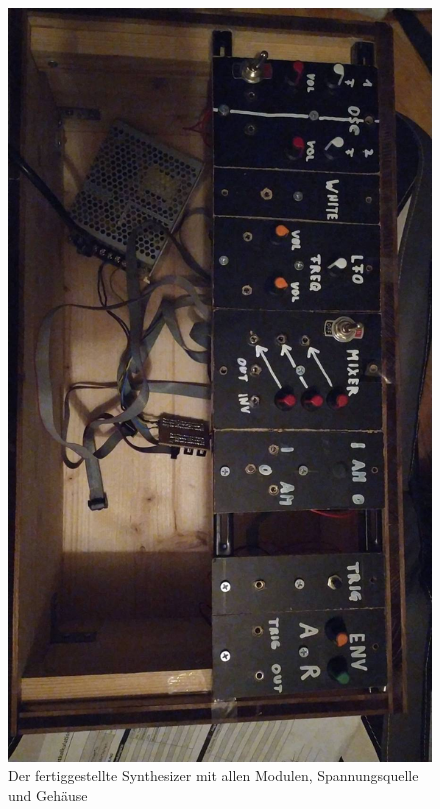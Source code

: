 \begin{figure}[hb]
  \includegraphics[angle=90,width=\linewidth]{figures/case.jpg}
  \caption{Der fertiggestellte Synthesizer mit allen Modulen, Spannungsquelle und Gehäuse}
  \label{fig:case}
\end{figure}
